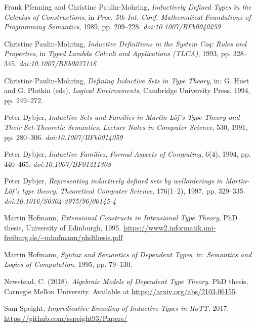 \documentclass{article}
\begin{document}
\newpage
\begin{thebibliography}{99}


Frank Pfenning and Christine Paulin-Mohring,
\textit{Inductively Defined Types in the Calculus of Constructions},
in \textit{Proc. 5th Int. Conf. Mathematical Foundations of Programming Semantics}, 1989, pp. 209–228.
\textit{doi:10.1007/BFb0040259}

Christine Paulin-Mohring,
\textit{Inductive Definitions in the System Coq: Rules and Properties},
in \textit{Typed Lambda Calculi and Applications (TLCA)}, 1993, pp. 328–345.
\textit{doi:10.1007/BFb0037116}

Christine Paulin-Mohring,
\textit{Defining Inductive Sets in Type Theory},
in: G. Huet and G. Plotkin (eds), \textit{Logical Environments}, Cambridge University Press, 1994, pp. 249–272.

Peter Dybjer,
\textit{Inductive Sets and Families in Martin-Löf's Type Theory and Their Set-Theoretic Semantics},
\textit{Lecture Notes in Computer Science}, 530, 1991, pp. 280–306.
\textit{doi:10.1007/BFb0014059}

Peter Dybjer,
\textit{Inductive Families},
\textit{Formal Aspects of Computing}, 6(4), 1994, pp. 440–465.
\textit{doi:10.1007/BF01211308}

Peter Dybjer,
\textit{Representing inductively defined sets by wellorderings in Martin-Löf’s type theory},
\textit{Theoretical Computer Science}, 176(1–2), 1997, pp. 329–335.
\textit{doi:10.1016/S0304-3975(96)00145-4}

Martin Hofmann,
\textit{Extensional Constructs in Intensional Type Theory},
PhD thesis, University of Edinburgh, 1995.
\url{https://www2.informatik.uni-freiburg.de/~mhofmann/phdthesis.pdf}

Martin Hofmann,
\textit{Syntax and Semantics of Dependent Types},
in: \textit{Semantics and Logics of Computation}, 1995, pp. 79–130.

Newstead, C. (2018).
\textit{Algebraic Models of Dependent Type Theory}.
PhD thesis, Carnegie Mellon University.
Available at \url{https://arxiv.org/abs/2103.06155}.


Sam Speight,
\textit{Impredicative Encoding of Inductive Types in HoTT},
2017.
\url{https://github.com/sspeight93/Papers/}


\end{thebibliography}
\end{document}

